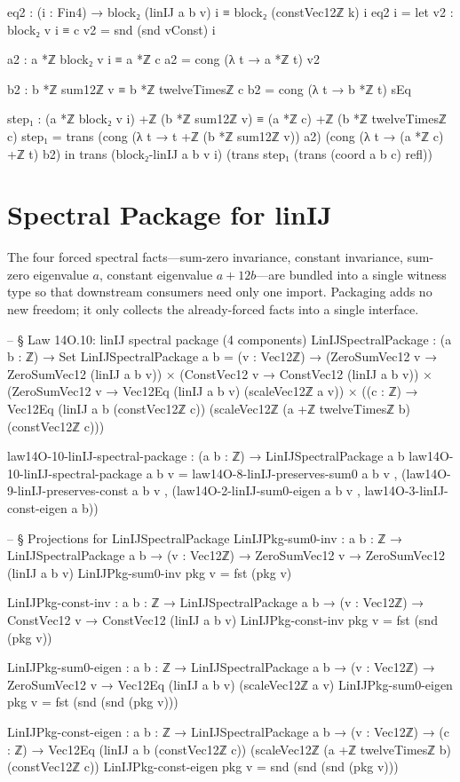 \documentclass[11pt,a4paper]{book}
\def\texttt#1{#1}%
\def\texorpdfstring#1#2{#2}%
\begin{document}
\begin{code}
    eq2 : (i : Fin4) → block₂ (linIJ a b v) i ≡ block₂ (constVec12ℤ k) i
    eq2 i =
      let
        v2 : block₂ v i ≡ c
        v2 = snd (snd vConst) i

        a2 : a *ℤ block₂ v i ≡ a *ℤ c
        a2 = cong (λ t → a *ℤ t) v2

        b2 : b *ℤ sum12ℤ v ≡ b *ℤ twelveTimesℤ c
        b2 = cong (λ t → b *ℤ t) sEq

        step₁ : (a *ℤ block₂ v i) +ℤ (b *ℤ sum12ℤ v) ≡ (a *ℤ c) +ℤ (b *ℤ twelveTimesℤ c)
        step₁ =
          trans
            (cong (λ t → t +ℤ (b *ℤ sum12ℤ v)) a2)
            (cong (λ t → (a *ℤ c) +ℤ t) b2)
      in
      trans
        (block₂-linIJ a b v i)
        (trans step₁ (trans (coord a b c) refl))
\end{code}


\section{Spectral Package for \texorpdfstring{$\texttt{linIJ}$}{linIJ}}

The four forced spectral facts---sum-zero invariance,
constant invariance, sum-zero eigenvalue $a$,
constant eigenvalue $a+12b$---are bundled into a single
witness type so that downstream consumers need only
one import.  Packaging adds no new freedom; it only collects the already-forced
facts into a single interface.

\begin{code}
-- § Law 14O.10: linIJ spectral package (4 components)
LinIJSpectralPackage : (a b : ℤ) → Set
LinIJSpectralPackage a b =
  (v : Vec12ℤ) →
    (ZeroSumVec12 v → ZeroSumVec12 (linIJ a b v)) ×
    (ConstVec12 v → ConstVec12 (linIJ a b v)) ×
    (ZeroSumVec12 v → Vec12Eq (linIJ a b v) (scaleVec12ℤ a v)) ×
    ((c : ℤ) → Vec12Eq (linIJ a b (constVec12ℤ c))
                      (scaleVec12ℤ (a +ℤ twelveTimesℤ b) (constVec12ℤ c)))

law14O-10-linIJ-spectral-package : (a b : ℤ) → LinIJSpectralPackage a b
law14O-10-linIJ-spectral-package a b v =
  law14O-8-linIJ-preserves-sum0 a b v ,
  (law14O-9-linIJ-preserves-const a b v ,
   (law14O-2-linIJ-sum0-eigen a b v ,
    law14O-3-linIJ-const-eigen a b))

-- § Projections for LinIJSpectralPackage
LinIJPkg-sum0-inv : {a b : ℤ} → LinIJSpectralPackage a b → (v : Vec12ℤ) → ZeroSumVec12 v → ZeroSumVec12 (linIJ a b v)
LinIJPkg-sum0-inv pkg v = fst (pkg v)

LinIJPkg-const-inv : {a b : ℤ} → LinIJSpectralPackage a b → (v : Vec12ℤ) → ConstVec12 v → ConstVec12 (linIJ a b v)
LinIJPkg-const-inv pkg v = fst (snd (pkg v))

LinIJPkg-sum0-eigen : {a b : ℤ} → LinIJSpectralPackage a b → (v : Vec12ℤ) → ZeroSumVec12 v → Vec12Eq (linIJ a b v) (scaleVec12ℤ a v)
LinIJPkg-sum0-eigen pkg v = fst (snd (snd (pkg v)))

LinIJPkg-const-eigen : {a b : ℤ} → LinIJSpectralPackage a b → (v : Vec12ℤ) → (c : ℤ) →
  Vec12Eq (linIJ a b (constVec12ℤ c)) (scaleVec12ℤ (a +ℤ twelveTimesℤ b) (constVec12ℤ c))
LinIJPkg-const-eigen pkg v = snd (snd (snd (pkg v)))
\end{code}
\end{document}
